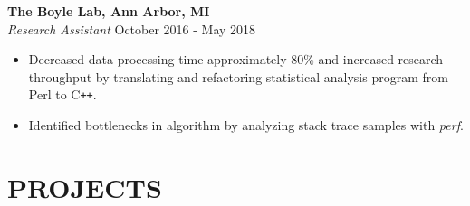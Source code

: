 \documentclass[overlapped]{res}
\begin{document}
\begin{resume}
\begin{itemize}




\end{itemize}

\textbf{The Boyle Lab, Ann Arbor, MI}\\
{\sl Research Assistant} \hfill October 2016 - May 2018
    \begin{itemize}  \itemsep -2pt %
    \item Decreased data processing time approximately 80\% 
    and increased research throughput
    by translating and refactoring statistical analysis program 
    from Perl to C\texttt{++}.
    
    \item Identified bottlenecks in algorithm by analyzing stack trace samples with \textit{perf}.
    
    

\end{itemize}

\section{PROJECTS}


\end{resume}
\end{document}
